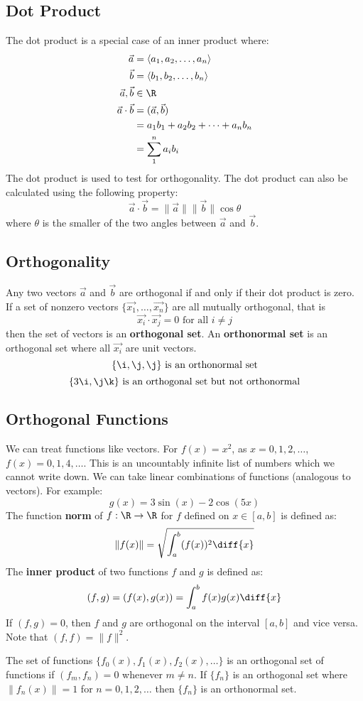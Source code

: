 \documentclass{math}
\begin{document}
\subsection*{Dot Product}
The dot product is a special case of an inner product where:
\begin{align*}
  \vec{a} &= \langle a_1,a_2,\dots,a_n \rangle \\
  \vec{b} &= \langle b_1,b_2,\dots,b_n \rangle \\
  \vec{a},\vec{b} &\in \R \\
  \vec{a}\cdot\vec{b} &= (\vec{a},\vec{b}) \\
  &= a_1b_1+a_2b_2+\dots+a_nb_n \\
  &= \sum_1^n{a_ib_i}
\end{align*}
The dot product is used to test for orthogonality. The dot product can also
be calculated using the following property:
\[ \vec{a}\cdot\vec{b} = \|\vec{a}\|\|\vec{b}\|\cos\theta \]
where \( \theta \) is the smaller of the two angles between \( \vec{a} \) and
\( \vec{b} \).

\subsection*{Orthogonality}
Any two vectors \( \vec{a} \) and \( \vec{b} \) are orthogonal if and only if
their dot product is zero. If a set of nonzero vectors
\( \{\vec{x_1},\dots,\vec{x_n}\} \) are all mutually orthogonal, that is
\[ \vec{x_i}\cdot\vec{x_j} = 0 \text{ for all } i\ne j \]
then the set of vectors is an \textbf{orthogonal set}. An \textbf{orthonormal
set} is an orthogonal set where all \( \vec{x_i} \) are unit vectors.
\[ \{\i,\j,\j\} \text{ is an orthonormal set} \]
\[ \{3\i,\j\k\} \text{ is an orthogonal set but not orthonormal} \]

\subsection*{Orthogonal Functions}
We can treat functions like vectors. For \( f(x) = x^2 \), as
\( x = 0,1,2,\dots \), \( f(x) = 0,1,4,\dots \). This is an uncountably
infinite list of numbers which we cannot write down. We can take linear
combinations of functions (analogous to vectors). For example:
\[ g(x) = 3\sin(x)-2\cos(5x) \]
The function \textbf{norm} of \( f:\R\to\R \) for \( f \) defined on
\( x\in[a,b] \) is defined as:
\[ \|f(x)\| = \sqrt{\int_a^b(f(x))^2\diff{x}} \]
The \textbf{inner product} of two functions \( f \) and \( g \) is
defined as:
\[ (f,g) = (f(x),g(x)) = \int_a^bf(x)g(x)\diff{x} \]
If \( (f,g) = 0 \), then \( f \) and \( g \) are orthogonal on the interval
\( [a,b] \) and vice versa. Note that \( (f,f) = \|f\|^2 \). \par
The set of functions \( \{f_0(x),f_1(x),f_2(x),\dots\} \) is an orthogonal set
of functions if \( (f_m,f_n) = 0 \) whenever \( m\ne n \). If \( \{f_n\} \) is
an orthogonal set where \( \|f_n(x)\| = 1 \) for \( n = 0,1,2,\dots \) then
\( \{f_n\} \) is an orthonormal set.
\end{document}
